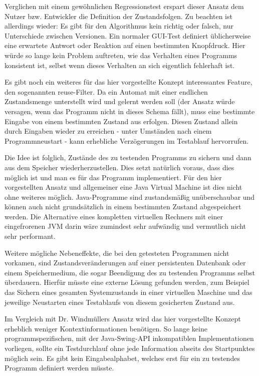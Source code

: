 Verglichen mit einem gewöhnlichen Regressionstest erspart dieser Ansatz dem Nutzer
bzw. Entwickler die Definition der Zustandsfolgen. Zu beachten ist allerdings wieder:
Es gibt für den Algorithmus kein richtig oder falsch, nur Unterschiede zwischen Versionen.
Ein normaler GUI-Test definiert üblicherweise eine erwartete Antwort oder Reaktion auf einen
bestimmten Knopfdruck. Hier würde so lange kein \glqq{}Problem\grqq{} auftreten, wie das Verhalten eines
Programms konsistent ist, selbst wenn dieses Verhalten an sich eigentlich fehlerhaft ist.

Es gibt noch ein weiteres für das hier vorgestellte Konzept interessantes Feature,
den sogenannten reuse-Filter. Da ein Automat mit einer endlichen Zustandsmenge unterstellt
wird und gelernt werden soll (der Ansatz würde versagen, wenn das Programm nicht in dieses
Schema fällt), muss eine bestimmte Eingabe von einem bestimmten Zustand aus erfolgen.
Diesen Zustand allein durch Eingaben wieder zu erreichen - unter Umständen nach einem Programmneustart -
kann erhebliche Verzögerungen im Testablauf hervorrufen.

Die Idee ist folglich, Zustände des
zu testenden Programms zu sichern und dann aus dem Speicher wiederherzustellen. Dies setzt
natürlich voraus, dass dies möglich ist und man es für das Programm implementiert.
Für den hier vorgestellten Ansatz und allgemeiner eine Java Virtual Machine ist dies nicht
ohne weiteres möglich. Java-Programme sind zustandsmäßig unüberschaubar und können auch nicht
grundsätzlich in einem bestimmten Zustand abgespeichert werden. Die Alternative
eines kompletten virtuellen Rechners mit einer eingefrorenen JVM darin wäre
zumindest sehr aufwändig und vermutlich nicht sehr performant.

Weitere mögliche Nebeneffekte, die bei den getesteten Programmen nicht vorkamen, sind
Zustandsveränderungen auf einer persistenten Datenbank oder einem Speichermedium, die sogar
Beendigung des zu testenden Programms selbst überdauern. Hierfür müsste eine externe
Lösung gefunden werden, zum Beispiel das Sichern eines gesamten Systemzustands in einer
virtuellen Maschine und das jeweilige Neustarten eines Testablaufs von diesem gesicherten
Zustand aus.

\vspace{0.5cm}

Im Vergleich mit Dr. Windmüllers Ansatz wird das hier vorgestellte Konzept erheblich weniger
Kontextinformationen benötigen. So lange keine programmspezifischen, mit der Java-Swing-API
inkompatiblen Implementationen vorliegen, sollte ein Testdurchlauf ohne jede Information abseits
des Startpunktes möglich sein. Es gibt kein Eingabealphabet, welches erst für ein zu testendes
Programm definiert werden müsste.

